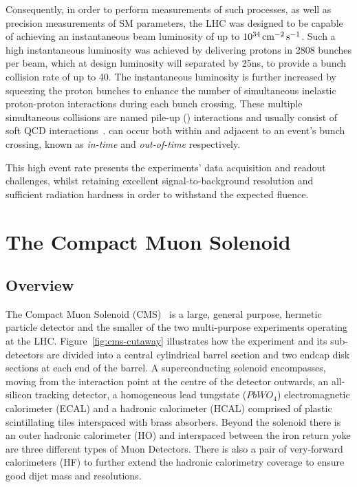 Consequently, in order to perform measurements of such processes, as well as precision measurements of SM parameters, the LHC was designed to be capable of achieving an instantaneous beam luminosity of up to $10^{34}\,\text{cm}^\text{$-$2}\,\text{s}^\text{$-$1}$.
Such a high instantaneous luminosity was achieved by delivering protons in 2808 bunches per beam, which at design luminosity will separated by 25ns, to provide a bunch collision rate of up to 40\MHz.
The instantaneous luminosity is further increased by squeezing the proton bunches to enhance the number of simultaneous inelastic proton-proton interactions during each bunch crossing.
These multiple simultaneous collisions are named pile-up (\PU) interactions and usually consist of soft QCD interactions~\cite{Bruning:782076,Ball:2007zza}.
\PU can occur both within and adjacent to an event's bunch crossing, known as \emph{in-time} and \emph{out-of-time} \PU respectively.

This high event rate presents the experiments' data acquisition and readout challenges, whilst retaining excellent signal-to-background resolution and sufficient radiation hardness in order to withstand the expected fluence.

\section{The Compact Muon Solenoid}\label{sec:cms}
\subsection{Overview}
The Compact Muon Solenoid (CMS)~\cite{oldcms} is a large, general purpose, hermetic particle detector and the smaller of the two multi-purpose experiments operating at the LHC.
Figure~\ref{fig:cms-cutaway} illustrates how the experiment and its sub-detectors are divided into a central cylindrical barrel section and two endcap disk sections at each end of the barrel.
A superconducting solenoid encompasses, moving from the interaction point at the centre of the detector outwards, an all-silicon tracking detector, a homogeneous lead tungstate ($PbWO_{4}$) electromagnetic calorimeter (ECAL) and a hadronic calorimeter (HCAL) comprised of plastic scintillating tiles interspaced with brass absorbers.
Beyond the solenoid there is an outer hadronic calorimeter (HO) and interspaced between the iron return yoke are three different types of Muon Detectors.
There is also a pair of very-forward calorimeters (HF) to further extend the hadronic calorimetry coverage to ensure good dijet mass and \MET resolutions.

